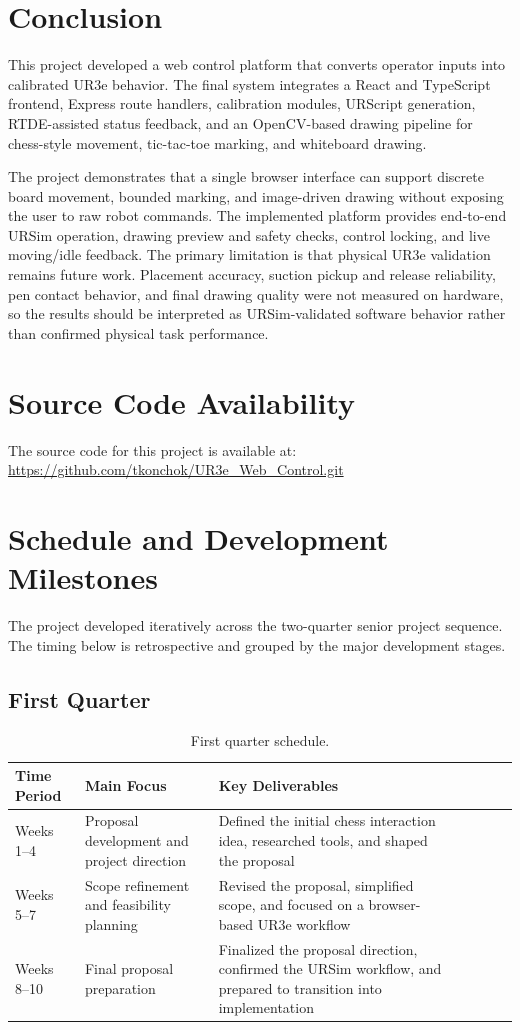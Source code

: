\documentclass[12pt]{article}
\newcommand{\tablegridon}{\arrayrulecolor{black!35}}
\newcommand{\tablegridoff}{\arrayrulecolor{black}}
\newcommand{\tabrowsep}{\\[0.12em]\hline}
\begin{document}
\section{Conclusion}
This project developed a web control platform that converts operator inputs into calibrated UR3e behavior. The final system integrates a React and TypeScript frontend, Express route handlers, calibration modules, URScript generation, RTDE-assisted status feedback, and an OpenCV-based drawing pipeline for chess-style movement, tic-tac-toe marking, and whiteboard drawing.

The project demonstrates that a single browser interface can support discrete board movement, bounded marking, and image-driven drawing without exposing the user to raw robot commands. The implemented platform provides end-to-end URSim operation, drawing preview and safety checks, control locking, and live moving/idle feedback. The primary limitation is that physical UR3e validation remains future work. Placement accuracy, suction pickup and release reliability, pen contact behavior, and final drawing quality were not measured on hardware, so the results should be interpreted as URSim-validated software behavior rather than confirmed physical task performance.

\section{Source Code Availability}
The source code for this project is available at:
\url{https://github.com/tkonchok/UR3e_Web_Control.git}

\section{Schedule and Development Milestones}
The project developed iteratively across the two-quarter senior project sequence. The timing below is retrospective and grouped by the major development stages.

\subsection{First Quarter}
\begin{table}[H]
\centering
\caption{First quarter schedule.}
\label{tab:first-quarter}
\small
\tablegridon
\begin{tabularx}{\textwidth}{|L{2.7cm}|L{3.3cm}|Y|}
\toprule
Time Period & Main Focus & Key Deliverables \\
\midrule
Weeks 1--4 & Proposal development and project direction & Defined the initial chess interaction idea, researched tools, and shaped the proposal \tabrowsep
Weeks 5--7 & Scope refinement and feasibility planning & Revised the proposal, simplified scope, and focused on a browser-based UR3e workflow \tabrowsep
Weeks 8--10 & Final proposal preparation & Finalized the proposal direction, confirmed the URSim workflow, and prepared to transition into implementation \\
\bottomrule
\end{tabularx}
\tablegridoff
\end{table}
\end{document}
